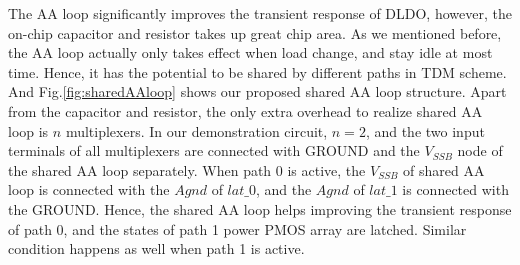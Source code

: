\documentclass[journal]{IEEEtran}
\begin{document}
The AA loop significantly improves the transient response of DLDO, however, the on-chip capacitor and resistor takes up great chip area. As we mentioned before, the AA loop actually only takes effect when load change, and stay idle at most time. Hence, it has the potential to be shared by different paths in TDM scheme. And Fig.\ref{fig:sharedAAloop} shows our proposed shared AA loop structure. Apart from the capacitor and resistor, the only extra overhead to realize shared AA loop is $n$ multiplexers. In our demonstration circuit, $n=2$, and the two input terminals of all multiplexers are connected with GROUND and the $V_{SSB}$ node of the shared AA loop separately. When path 0 is active, the $V_{SSB}$ of shared AA loop is connected with the $Agnd$ of $lat\_0$, and the $Agnd$ of $lat\_1$ is connected with the GROUND. Hence, the shared AA loop helps improving the transient response of path 0, and the states of path 1 power PMOS array are latched. Similar condition happens as well when path 1 is active.
\end{document}
